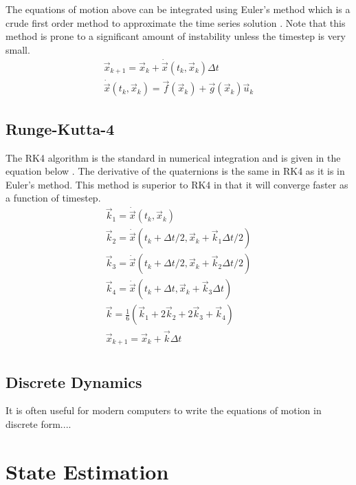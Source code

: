 \documentclass{article}
\begin{document}
The equations of motion above can be integrated using Euler's method
which is a crude first order method to approximate the time series
solution \cite{Chapra_MEANALYSIS}. Note that this method is prone to a 
significant amount of instability unless the timestep is very small. 
\begin{equation}
  \begin{matrix}
    \vec{x}_{k+1} = \vec{x}_k + \dot{\vec{x}}(t_k,\vec{x}_k) \Delta t \\
    \dot{\vec{x}}(t_k,\vec{x}_k) = \vec{f}(\vec{x}_k) + \vec{g}(\vec{x}_k)\vec{u}_k
  \end{matrix}
\end{equation}

\subsection{Runge-Kutta-4}

The RK4 algorithm is the standard in numerical integration and is
given in the equation below \cite{Chapra_MEANALYSIS}. The derivative
of the quaternions is the same in RK4 as it is in Euler's method. This
method is superior to RK4 in that it will converge faster as a
function of timestep.
\begin{equation}
  \begin{matrix}
    \vec{k}_1 = \dot{\vec{x}}(t_k,\vec{x}_k)\\
    \vec{k}_2 = \dot{\vec{x}}(t_k+\Delta t/2,\vec{x}_k+\vec{k}_1\Delta t/2)\\
    \vec{k}_3 = \dot{\vec{x}}(t_k+\Delta t/2,\vec{x}_k+\vec{k}_2\Delta t/2)\\
    \vec{k}_4 = \dot{\vec{x}}(t_k+\Delta t,\vec{x}_k+\vec{k}_3\Delta t)\\
    \vec{k} = \frac{1}{6}(\vec{k}_1 + 2\vec{k}_2 + 2\vec{k}_3 + \vec{k}_4)\\
    \vec{x}_{k+1} = \vec{x}_k + \vec{k} \Delta t \\
  \end{matrix}
\end{equation}

\subsection{Discrete Dynamics}

It is often useful for modern computers to write the equations of
motion in discrete form....

\section{State Estimation}
\end{document}
